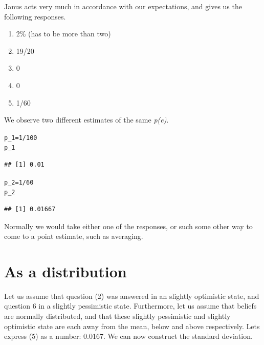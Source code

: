 \documentclass[a4paper]{book}\usepackage{graphicx, color}
\makeatletter
\newenvironment{kframe}{%
 \def\at@end@of@kframe{}%
 \ifinner\ifhmode%
  \def\at@end@of@kframe{\end{minipage}}%
  \begin{minipage}{\columnwidth}%
 \fi\fi%
 \def\FrameCommand##1{\hskip\@totalleftmargin \hskip-\fboxsep
 \colorbox{shadecolor}{##1}\hskip-\fboxsep
     \hskip-\linewidth \hskip-\@totalleftmargin \hskip\columnwidth}%
 \MakeFramed {\advance\hsize-\width
   \@totalleftmargin\z@ \linewidth\hsize
   \@setminipage}}%
 {\par\unskip\endMakeFramed%
 \at@end@of@kframe}
\newenvironment{knitrout}{}{} %
\makeatother
\begin{document}
Janus acts very much in accordance with our expectations, and gives us
the following responses.

\begin{enumerate}
\def\labelenumi{\arabic{enumi}.}
\itemsep1pt\parskip0pt
\item
  2\% (has to be more than two)
\item
  19/20
\item
  0
\item
  0
\item
  1/60
\end{enumerate}

We observe two different estimates of the same \emph{p(e)}.

\begin{knitrout}
\color{fgcolor}\begin{kframe}
\begin{alltt}
p_1 = 1/100
p_1
\end{alltt}
\begin{verbatim}
## [1] 0.01
\end{verbatim}
\end{kframe}
\end{knitrout}


\begin{knitrout}
\color{fgcolor}\begin{kframe}
\begin{alltt}
p_2 = 1/60
p_2
\end{alltt}
\begin{verbatim}
## [1] 0.01667
\end{verbatim}
\end{kframe}
\end{knitrout}



Normally we would take either one of the responses, or such some other
way to come to a point estimate, such as averaging.

\section{As a distribution}

Let us assume that question (2) was answered in an slightly optimistic
state, and question 6 in a slightly pessimistic state. Furthermore, let
us assume that beliefs are normally distributed, and that these slightly
pessimistic and slightly optimistic state are each away from the mean,
below and above respectively. Lets express (5) as a number: 0.0167. We
can now construct the standard deviation.
\end{document}
